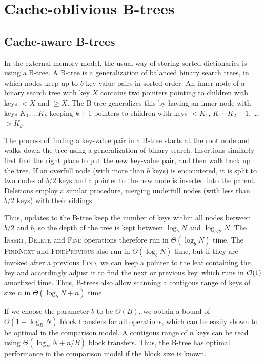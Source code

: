 \chapter{Cache-oblivious B-trees}

\section{Cache-aware B-trees}
In the external memory model, the usual way of storing sorted dictionaries
is using a B-tree. A B-tree is a generalization of balanced binary search
trees, in which nodes keep up to $b$ key-value pairs in sorted order.
An inner node of a binary search tree with key $X$ contains two pointers
pointing to children with keys $< X$ and $\geq X$. The B-tree generalizes
this by having an inner node with keys $K_1,\ldots K_k$ keeping $k+1$ pointers
to children with keys $< K_1$, $K_1\cdots K_2-1$, \dots, $> K_k$.

The process of finding a key-value pair in a B-tree starts at the root node
and walks down the tree using a generalization of binary search. Insertions
similarly first find the right place to put the new key-value pair, and
then walk back up the tree. If an overfull node (with more than $b$ keys)
is encountered, it is split to two nodes of $b/2$ keys and a pointer to
the new node is inserted into the parent. Deletions employ a similar procedure,
merging underfull nodes (with less than $b/2$ keys) with their siblings.

Thus, updates to the B-tree keep the number of keys within all nodes between
$b/2$ and $b$, so the depth of the tree is kept between $\log_b N$ and
$\log_{b/2} N$. The \textsc{Insert}, \textsc{Delete} and
\textsc{Find} operations therefore run in $\Theta(\log_b N)$ time.
The \textsc{FindNext} and \textsc{FindPrevious} also run in $\Theta(\log_b N)$ time,
but if they are invoked after a previous \textsc{Find}, we can keep a pointer
to the leaf containing the key and accordingly adjust it to find the next
or previous key, which runs in $\mathcal{O}(1)$ amortized time.
Thus, B-trees also allow scanning a contigous range of keys of size $n$
in $\Theta(\log_b N + n)$ time.

If we choose the parameter $b$ to be $\Theta(B)$, we obtain a bound of
$\Theta(1+\log_B N)$ block transfers for all operations, which can
be easily shown to be optimal in the comparison model.
A contigous range of $n$ keys can be
read using $\Theta(\log_B N+n/B)$ block transfers.
Thus, the B-tree has optimal performance in the comparison model
if the block size is known.

